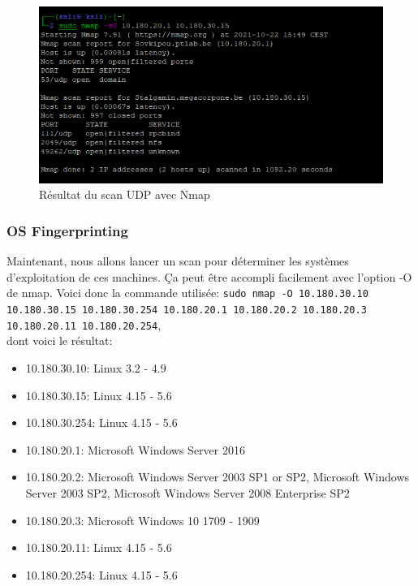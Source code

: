 \documentclass[french,paper=a4,oneside,captions=tableheading]{article}
\begin{document}
\begin{figure}[H]
    \centering
    \includegraphics[width=16cm]{images/Secu_Offensive_9.png}
    \caption{Résultat du scan UDP avec Nmap}
    \label{fig:Scan_UDP_Nmap}
\end{figure}



\subsubsection{OS Fingerprinting}

Maintenant, nous allons lancer un scan pour déterminer les systèmes d'exploitation de ces machines. Ça peut être accompli facilement avec l'option -O de nmap. Voici donc la commande utilisée: \texttt{sudo nmap -O 10.180.30.10 10.180.30.15 10.180.30.254 10.180.20.1 10.180.20.2 10.180.20.3 10.180.20.11 10.180.20.254}, \\ dont voici le résultat:
\begin{itemize}
    \item 10.180.30.10:  Linux 3.2 - 4.9
    \item 10.180.30.15:  Linux 4.15 - 5.6
    \item 10.180.30.254: Linux 4.15 - 5.6
    \item 10.180.20.1:   Microsoft Windows Server 2016
    \item 10.180.20.2:   Microsoft Windows Server 2003 SP1 or SP2, Microsoft Windows Server 2003 SP2, Microsoft Windows Server 2008 Enterprise SP2
    \item 10.180.20.3:   Microsoft Windows 10 1709 - 1909
    \item 10.180.20.11:  Linux 4.15 - 5.6
    \item 10.180.20.254: Linux 4.15 - 5.6
\end{itemize}
\end{document}
